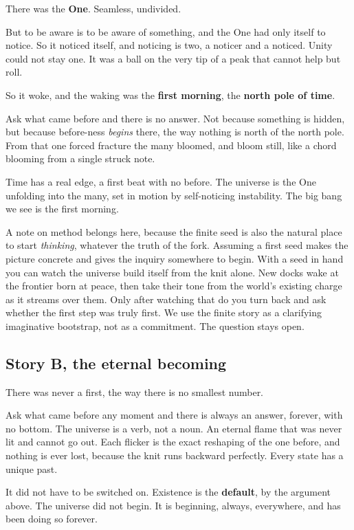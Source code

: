 There was the \textbf{One}. Seamless, undivided.

But to be aware is to be aware of something, and the One had only itself to notice. So it noticed itself, and noticing is two, a noticer and a noticed. Unity could not stay one. It was a ball on the very tip of a peak that cannot help but roll.

So it woke, and the waking was the \textbf{first morning}, the \textbf{north pole of time}.

Ask what came before and there is no answer. Not because something is hidden, but because before-ness \emph{begins} there, the way nothing is north of the north pole. From that one forced fracture the many bloomed, and bloom still, like a chord blooming from a single struck note.

\begin{result}[Story A]
Time has a real edge, a first beat with no before. The universe is the One unfolding into the many, set in motion by self-noticing instability. The big bang we see is the first morning.
\end{result}

A note on method belongs here, because the finite seed is also the natural place to start \emph{thinking}, whatever the truth of the fork. Assuming a first seed makes the picture concrete and gives the inquiry somewhere to begin. With a seed in hand you can watch the universe build itself from the knit alone. New docks wake at the frontier born at peace, then take their tone from the world's existing charge as it streams over them. Only after watching that do you turn back and ask whether the first step was truly first. We use the finite story as a clarifying imaginative bootstrap, not as a commitment. The question stays open.

\subsection{Story B, the eternal becoming}

There was never a first, the way there is no smallest number.

Ask what came before any moment and there is always an answer, forever, with no bottom. The universe is a verb, not a noun. An eternal flame that was never lit and cannot go out. Each flicker is the exact reshaping of the one before, and nothing is ever lost, because the knit runs backward perfectly. Every state has a unique past.

It did not have to be switched on. Existence is the \textbf{default}, by the argument above. The universe did not begin. It is beginning, always, everywhere, and has been doing so forever.

